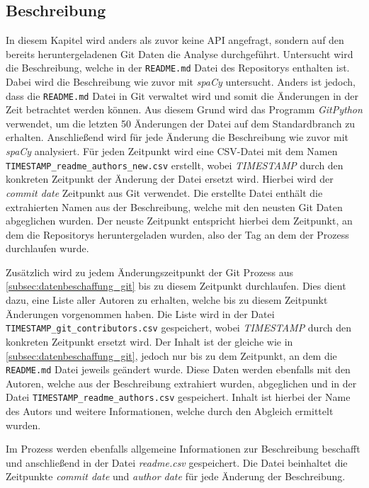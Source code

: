 \subsection{Beschreibung}
\label{subsec:datenbeschaffung_beschreibung}
In diesem Kapitel wird anders als zuvor keine API angefragt, sondern auf den bereits heruntergeladenen Git Daten die Analyse durchgeführt.
Untersucht wird die Beschreibung, welche in der \texttt{README.md} Datei des Repositorys enthalten ist.
Dabei wird die Beschreibung wie zuvor mit \emph{spaCy} untersucht.
Anders ist jedoch, dass die \texttt{README.md} Datei in Git verwaltet wird und somit die Änderungen in der Zeit betrachtet werden können.
Aus diesem Grund wird das Programm \emph{GitPython} verwendet, um die letzten 50 Änderungen der Datei auf dem Standardbranch zu erhalten.
Anschließend wird für jede Änderung die Beschreibung wie zuvor mit \emph{spaCy} analysiert.
Für jeden Zeitpunkt wird eine CSV-Datei mit dem Namen \texttt{TIMESTAMP\_readme\_authors\_new.csv} erstellt, wobei \emph{TIMESTAMP} durch den konkreten Zeitpunkt der Änderung der Datei ersetzt wird.
Hierbei wird der \emph{commit date} Zeitpunkt aus Git verwendet.
Die erstellte Datei enthält die extrahierten Namen aus der Beschreibung, welche mit den neusten Git Daten abgeglichen wurden.
Der neuste Zeitpunkt entspricht hierbei dem Zeitpunkt, an dem die Repositorys heruntergeladen wurden, also der Tag an dem der Prozess durchlaufen wurde.

Zusätzlich wird zu jedem Änderungszeitpunkt der Git Prozess aus \autoref{subsec:datenbeschaffung_git} bis zu diesem Zeitpunkt durchlaufen.
Dies dient dazu, eine Liste aller Autoren zu erhalten, welche bis zu diesem Zeitpunkt Änderungen vorgenommen haben.
Die Liste wird in der Datei \texttt{TIMESTAMP\_git\_contributors.csv} gespeichert, wobei \emph{TIMESTAMP} durch den konkreten Zeitpunkt ersetzt wird.
Der Inhalt ist der gleiche wie in \autoref{subsec:datenbeschaffung_git}, jedoch nur bis zu dem Zeitpunkt, an dem die \texttt{README.md} Datei jeweils geändert wurde.
Diese Daten werden ebenfalls mit den Autoren, welche aus der Beschreibung extrahiert wurden, abgeglichen und in der Datei \texttt{TIMESTAMP\_readme\_authors.csv} gespeichert.
Inhalt ist hierbei der Name des Autors und weitere Informationen, welche durch den Abgleich ermittelt wurden.

Im Prozess werden ebenfalls allgemeine Informationen zur Beschreibung beschafft und anschließend in der Datei \emph{readme.csv} gespeichert.
Die Datei beinhaltet die Zeitpunkte \emph{commit date} und \emph{author date} für jede Änderung der Beschreibung.
